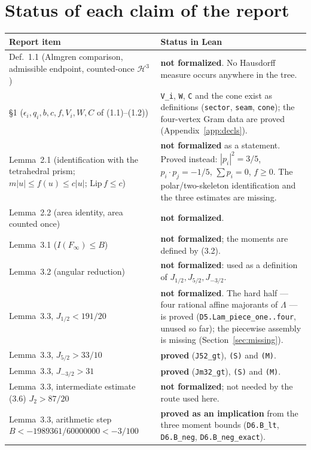 \documentclass[11pt]{article}
\newcommand{\Ln}[1]{\texttt{#1}}
\newcommand{\Sc}{\texttt{(S)}}
\newcommand{\Me}{\texttt{(M)}}
\begin{document}
\section{Status of each claim of the report}
\label{sec:status}

\begin{longtable}{L{5.3cm}L{10.4cm}}
\toprule
Report item & Status in Lean \\
\midrule\endhead
Def.~1.1 (Almgren comparison, admissible endpoint, counted-once $\mathcal{H}^3$) &
\textbf{not formalized}. No Hausdorff measure occurs anywhere in the tree.\\
\S1 ($\epsilon_i,q_i,b,c,f,V_i,W,C$ of (1.1)--(1.2)) &
\Ln{V\_\allowbreak{}i}, \Ln{W}, \Ln{C} and the cone exist as definitions (\Ln{sector}, \Ln{seam},
\Ln{cone}); the four-vertex Gram data are proved (Appendix~\ref{app:decls}).\\
Lemma~2.1 (identification with the tetrahedral prism; $m|u|\le f(u)\le c|u|$;
$\mathrm{Lip}\,f\le c$) & \textbf{not formalized} as a statement. Proved instead:
$|p_i|^2=3/5$, $p_i\cdot p_j=-1/5$, $\sum p_i=0$, $f\ge0$. The polar/two-skeleton
identification and the three estimates are missing.\\
Lemma~2.2 (area identity, area counted once) & \textbf{not formalized}.\\
Lemma~3.1 ($I(F_\infty)\le B$) & \textbf{not formalized}; the moments are defined by (3.2).\\
Lemma~3.2 (angular reduction) & \textbf{not formalized}: used as a definition of
$J_{1/2},J_{5/2},J_{-3/2}$.\\
Lemma~3.3, $J_{1/2}<191/20$ & \textbf{not formalized}. The hard half --- four rational
affine majorants of $\Lambda$ --- is proved (\Ln{D5.Lam\_\allowbreak{}piece\_\allowbreak{}one..four}, unused so far);
the piecewise assembly is missing (Section~\ref{sec:missing}).\\
Lemma~3.3, $J_{5/2}>33/10$ & \textbf{proved} (\Ln{J52\_\allowbreak{}gt}), \Sc{} and \Me.\\
Lemma~3.3, $J_{-3/2}>31$ & \textbf{proved} (\Ln{Jm32\_\allowbreak{}gt}), \Sc{} and \Me.\\
Lemma~3.3, intermediate estimate (3.6) $J_2>87/20$ & \textbf{not formalized}; not needed by
the route used here.\\
Lemma~3.3, arithmetic step $B<-1989361/60000000<-3/100$ & \textbf{proved as an implication}
from the three moment bounds (\Ln{D6.B\_\allowbreak{}lt}, \Ln{D6.B\_\allowbreak{}neg}, \Ln{D6.B\_\allowbreak{}neg\_\allowbreak{}exact}).\\

\end{longtable}
\end{document}
